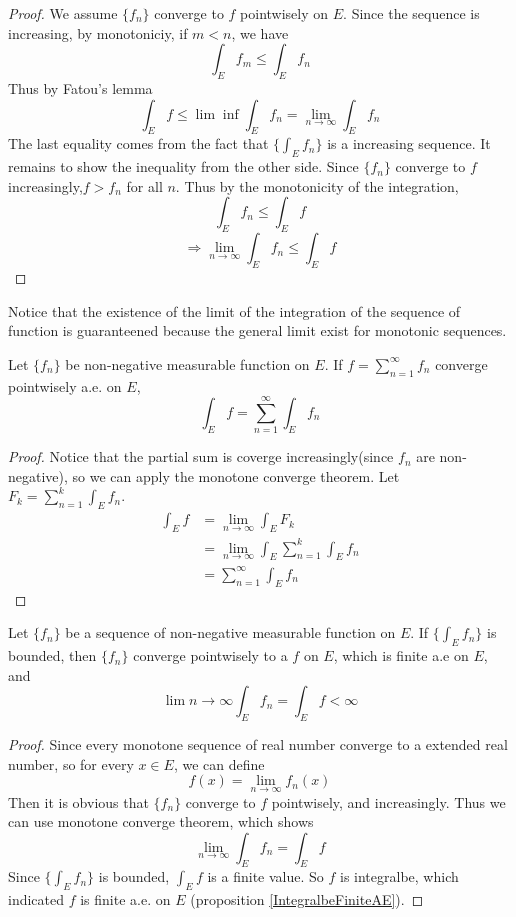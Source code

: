 \documentclass[lang=en, 12pt]{elegantbook}
\begin{document}
    \begin{proof}
        We assume $\{f_n\}$ converge to $f$ pointwisely on $E$. Since the sequence is increasing, by monotoniciy, if $m<n$, we have
        $$\int_E f_m \leq \int_E f_n$$
        Thus by Fatou's lemma 
        $$\int_E f \leq \lim \inf \int_E f_n = \lim_{n\to \infty}\int_E f_n$$
    The last equality comes from the fact that $\{\int_E f_n\}$ is a increasing sequence. It remains to show the inequality from the other
    side. Since $\{f_n\}$ converge to $f$ increasingly,$f> f_n$ for all $n$. Thus by the monotonicity of the integration,
        $$\int_E f_n \leq \int_E f$$
        $$\Rightarrow \lim_{n \to \infty} \int_E f_n \leq \int_E f$$
    \end{proof}
    Notice that the existence of the limit of the integration of the sequence of function is guaranteened because the general limit exist 
    for monotonic sequences.
    \begin{corollary}
        Let $\{f_n\}$ be non-negative measurable function on $E$. If $f = \sum_{n=1}^{\infty} f_n$ converge pointwisely a.e. on $E$,
        $$\int_E f = \sum_{n=1}^{\infty} \int_E f_n$$
    \end{corollary}
    \begin{proof}
        Notice that the partial sum is coverge increasingly(since $f_n$ are non-negative), so we can apply the monotone converge theorem.
    Let $F_k = \sum_{n=1}^{k} \int_E f_n$.
        \begin{equation*}
            \begin{aligned}
                \int_E f &= \lim_{n \to \infty} \int_E F_k\\
                &= \lim_{n \to \infty} \int_E \sum_{n=1}^{k} \int_E f_n\\
                &= \sum_{n=1}^{\infty} \int_E f_n
            \end{aligned}
        \end{equation*}
    \end{proof}
    \begin{lemma}
        Let $\{f_n\}$ be a sequence of non-negative measurable function on $E$. If $\{\int_E f_n\}$ is bounded, then $\{f_n\}$ converge 
    pointwisely to a $f$ on $E$, which is finite a.e on $E$, and 
    $$\lim{n \to \infty} \int_E f_n = \int_E f < \infty$$ 
    \end{lemma}
    \begin{proof}
        Since every monotone sequence of real number converge to a extended real number, so for every $x\in E$, we can define 
        $$f(x) = \lim_{n\to \infty} f_n (x)$$
    Then it is obvious that $\{f_n\}$ converge to $f$ pointwisely, and increasingly. Thus we can use monotone converge theorem, which shows
        $$\lim_{n\to \infty} \int_E f_n = \int_E f$$
        Since $\{\int_E f_n\}$ is bounded, $\int_E f$ is a finite value. So $f$ is integralbe, which indicated $f$ is finite a.e. on $E$
        (proposition \ref{IntegralbeFiniteAE}).
    \end{proof}
\end{document}

